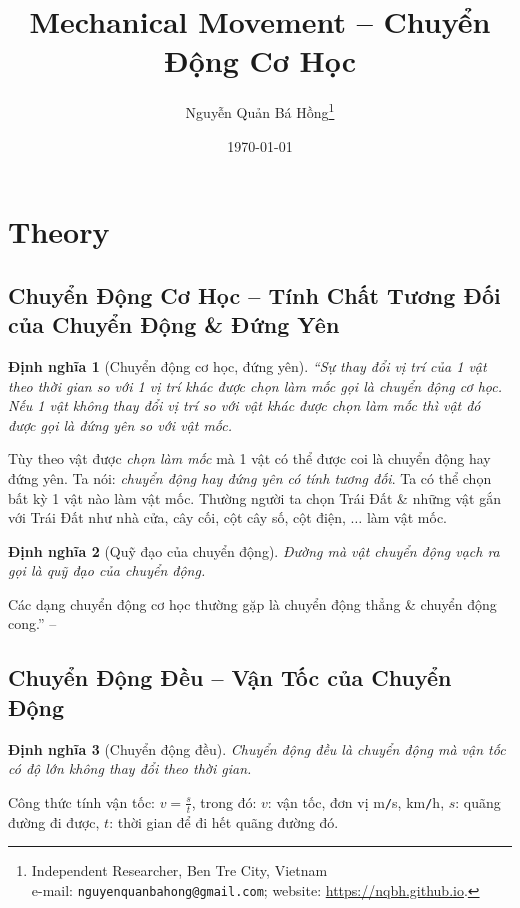 \documentclass{article}
\title{Mechanical Movement -- Chuyển Động Cơ Học}
\author{Nguyễn Quản Bá Hồng\footnote{Independent Researcher, Ben Tre City, Vietnam\\e-mail: \texttt{nguyenquanbahong@gmail.com}; website: \url{https://nqbh.github.io}.}}
\date{\today}
\numberwithin{equation}{section}
\newtheorem{dinhnghia}{Định nghĩa}[section]
\begin{document}
\maketitle
\begin{abstract}
	
\end{abstract}
\setcounter{secnumdepth}{4}
\setcounter{tocdepth}{3}
\tableofcontents


\section{Theory}

\subsection{Chuyển Động Cơ Học -- Tính Chất Tương Đối của Chuyển Động \& Đứng Yên}

\begin{dinhnghia}[Chuyển động cơ học, đứng yên]
	``Sự thay đổi vị trí của 1 vật theo thời gian so với 1 vị trí khác được chọn làm mốc gọi là \emph{chuyển động cơ học}. Nếu 1 vật không thay đổi vị trí so với vật khác được chọn làm mốc thì vật đó được gọi là \emph{đứng yên} so với vật mốc.
\end{dinhnghia}
Tùy theo vật được \textit{chọn làm mốc} mà 1 vật có thể được coi là chuyển động hay đứng yên. Ta nói: \textit{chuyển động hay đứng yên có tính tương đối}. Ta có thể chọn bất kỳ 1 vật nào làm vật mốc. Thường người ta chọn Trái Đất \& những vật gắn với Trái Đất như nhà cửa, cây cối, cột cây số, cột điện, $\ldots$ làm vật mốc.

\begin{dinhnghia}[Quỹ đạo của chuyển động]
	Đường mà vật chuyển động vạch ra gọi là \emph{quỹ đạo của chuyển động}.
\end{dinhnghia}
Các dạng chuyển động cơ học thường gặp là chuyển động thẳng \& chuyển động cong.'' -- \cite[p. 5]{Thinh_Lua2021}

\subsection{Chuyển Động Đều -- Vận Tốc của Chuyển Động}

\begin{dinhnghia}[Chuyển động đều]
	\emph{Chuyển động đều} là chuyển động mà vận tốc có độ lớn không thay đổi theo thời gian.
\end{dinhnghia}
Công thức tính vận tốc: $v = \frac{s}{t}$, trong đó: $v$: vận tốc, đơn vị m\texttt{/}s, km\texttt{/}h, $s$: quãng đường đi được, $t$: thời gian để đi hết quãng đường đó.
\end{document}
